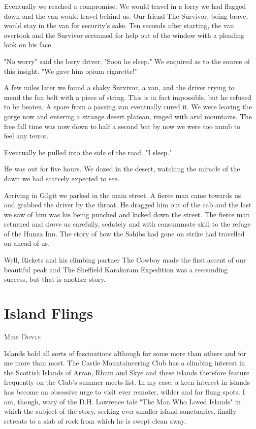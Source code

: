 \documentclass[a5paper,openany,font 10pt]{scrbook}
\makeatletter
\newcommand{\chapterauthor}[1]{%
{\parindent0pt\vspace*{-5pt}%
\linespread{1.1}\large\scshape#1%
\par\nobreak\vspace*{35pt}}
\@afterheading%
}
\makeatother
\begin{document}
Eventually we reached a compromise. We would travel in a
lorry we had flagged down and the van would travel behind us. Our
friend The Survivor, being brave, would stay in the van for
security's sake. Ten seconds after starting, the van overtook and
the Survivor screamed for help out of the window with a pleading
look on his face.

"No worry" said the lorry driver, "Soon he sleep."
We enquired as to the source of this insight.
"We gave him opium cigarette!"

A few miles later we found a shaky Survivor, a van, and the
driver trying to mend the fan belt with a piece of string. This
is in fact impossible, but he refused to be beaten. A spare from
a passing van eventually cured it. We were leaving the gorge now
and entering a strange desert plateau, ringed with arid mountains.
The free fall time was now down to half a second but by
now we were too numb to feel any terror.

Eventually he pulled into the side of the road.
	"I sleep."

He was out for five hours. We dozed in the desert, watching
the miracle of the dawn we had scarcely expected to see.

Arriving in Gilgit we parked in the main street. A fierce
man came towards us and grabbed the driver by the throat. He
dragged him out of the cab and the last we saw of him was his
being punched and kicked down the street. The fierce man returned
and drove us carefully, sedately and with consummate skill to the
refuge of the Hunza Inn. The story of how the Sahibs had gone on
strike had travelled on ahead of us.

Well, Rickets and his climbing partner The Cowboy made the
first ascent of our beautiful peak and The Sheffield Karakoram
Expedition was a resounding success, but that is another story.

\chapter{Island Flings}
\label{sec:org683055d}
\chapterauthor{Mike Doyle}

Islands hold all sorts of fascinations although for some more than
others and for me more than most. The Castle Mountaineering Club has a
climbing interest in the Scottish Islands of Arran, Rhum and Skye and
these islands therefore feature frequently on the Club's summer meets
list. In my case, a keen interest in islands has become an obsessive
urge to visit ever remoter, wilder and far flung spots. I am, though,
wary of the D.H. Lawrence tale "The Man Who Loved Islands" in which
the subject of the story, seeking ever smaller island sanctuaries,
finally retreats to a slab of rock from which he is swept clean away.
\end{document}
